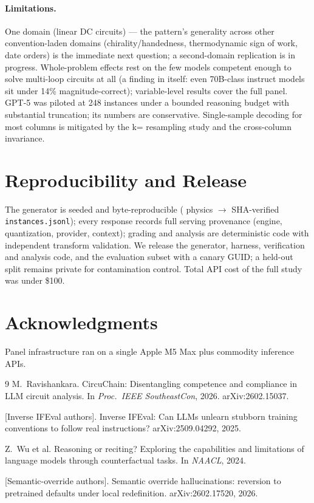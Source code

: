 \documentclass[11pt]{article}
\begin{document}
\paragraph{Limitations.} One domain (linear DC circuits) --- the pattern's
generality across other convention-laden domains (chirality/handedness,
thermodynamic sign of work, date orders) is the immediate next question; a
second-domain replication is in progress. Whole-problem effects rest on the
few models competent enough to solve multi-loop circuits at all (a finding in
itself: even 70B-class instruct models sit under 14\% magnitude-correct);
variable-level results cover the full panel. GPT-5 was piloted at 248
instances under a bounded reasoning budget with substantial truncation;
its numbers are conservative. Single-sample decoding for most columns is
mitigated by the k=\RetestK{} resampling study and the cross-column
invariance.

\section*{Reproducibility and Release}
The generator is seeded and byte-reproducible (\NPhysics{} physics
$\to$ SHA-verified \texttt{instances.jsonl}); every response records full
serving provenance (engine, quantization, provider, context); grading and
analysis are deterministic code with \TvPass{} independent transform
validation. We release the generator, harness, verification and analysis
code, and the evaluation subset with a canary GUID; a held-out split remains
private for contamination control. Total API cost of the full study was
under \$100.

\section*{Acknowledgments}
Panel infrastructure ran on a single Apple M5 Max plus commodity inference
APIs.

\begin{thebibliography}{9}\small
{}
M.~Ravishankara.
\newblock CircuChain: Disentangling competence and compliance in LLM circuit
analysis.
\newblock In \emph{Proc.\ IEEE SoutheastCon}, 2026. arXiv:2602.15037.

[Inverse IFEval authors].
\newblock Inverse IFEval: Can LLMs unlearn stubborn training conventions to
follow real instructions?
\newblock arXiv:2509.04292, 2025.

Z.~Wu et al.
\newblock Reasoning or reciting? Exploring the capabilities and limitations of
language models through counterfactual tasks.
\newblock In \emph{NAACL}, 2024.

[Semantic-override authors].
\newblock Semantic override hallucinations: reversion to pretrained defaults
under local redefinition.
\newblock arXiv:2602.17520, 2026.
\end{thebibliography}
\end{document}
